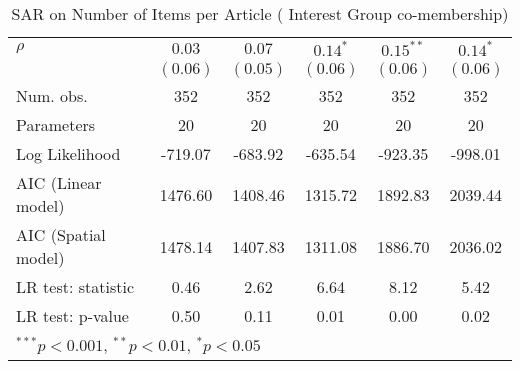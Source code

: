 \begin{table}[!h]
\begin{center}
\begin{tabular}{l c c c c c }
$\rho$                  & $0.03$       & $0.07$        & $0.14^{*}$   & $0.15^{**}$  & $0.14^{*}$   \\
                        & $(0.06)$     & $(0.05)$      & $(0.06)$     & $(0.06)$     & $(0.06)$     \\
\midrule
Num. obs.               & 352          & 352           & 352          & 352          & 352          \\
Parameters              & 20           & 20            & 20           & 20           & 20           \\
Log Likelihood          & -719.07      & -683.92       & -635.54      & -923.35      & -998.01      \\
AIC (Linear model)      & 1476.60      & 1408.46       & 1315.72      & 1892.83      & 2039.44      \\
AIC (Spatial model)     & 1478.14      & 1407.83       & 1311.08      & 1886.70      & 2036.02      \\
LR test: statistic      & 0.46         & 2.62          & 6.64         & 8.12         & 5.42         \\
LR test: p-value        & 0.50         & 0.11          & 0.01         & 0.00         & 0.02         \\
\bottomrule
\multicolumn{6}{l}{\scriptsize{$^{***}p<0.001$, $^{**}p<0.01$, $^*p<0.05$}}
\end{tabular}
\caption{SAR on Number of Items per Article ( Interest Group co-membership)}
\label{table:coefficients}
\end{center}
\end{table}
